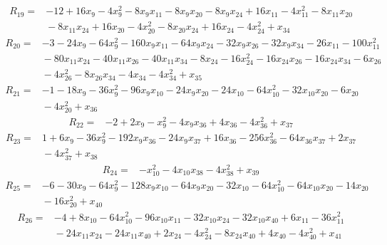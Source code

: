 \begin{align*}
R_{19}={}& -12 + 16x_{9} - 4x_{9}^{2} - 8x_{9}x_{11} - 8x_{9}x_{20} - 8x_{9}x_{24} + 16x_{11} - 4x_{11}^{2} - 8x_{11}x_{20} \\
&{} - 8x_{11}x_{24} + 16x_{20} - 4x_{20}^{2} - 8x_{20}x_{24} + 16x_{24} - 4x_{24}^{2} + x_{34}
\end{align*}
\begin{align*}
R_{20}={}& -3 - 24x_{9} - 64x_{9}^{2} - 160x_{9}x_{11} - 64x_{9}x_{24} - 32x_{9}x_{26} - 32x_{9}x_{34} - 26x_{11} - 100x_{11}^{2} \\
&{} - 80x_{11}x_{24} - 40x_{11}x_{26} - 40x_{11}x_{34} - 8x_{24} - 16x_{24}^{2} - 16x_{24}x_{26} - 16x_{24}x_{34} - 6x_{26} \\
&{} - 4x_{26}^{2} - 8x_{26}x_{34} - 4x_{34} - 4x_{34}^{2} + x_{35}
\end{align*}
\begin{align*}
R_{21}={}& -1 - 18x_{9} - 36x_{9}^{2} - 96x_{9}x_{10} - 24x_{9}x_{20} - 24x_{10} - 64x_{10}^{2} - 32x_{10}x_{20} - 6x_{20} \\
&{} - 4x_{20}^{2} + x_{36}
\end{align*}
\begin{align*}
R_{22}={}& -2 + 2x_{9} - x_{9}^{2} - 4x_{9}x_{36} + 4x_{36} - 4x_{36}^{2} + x_{37}
\end{align*}
\begin{align*}
R_{23}={}& 1 + 6x_{9} - 36x_{9}^{2} - 192x_{9}x_{36} - 24x_{9}x_{37} + 16x_{36} - 256x_{36}^{2} - 64x_{36}x_{37} + 2x_{37} \\
&{} - 4x_{37}^{2} + x_{38}
\end{align*}
\begin{align*}
R_{24}={}& -x_{10}^{2} - 4x_{10}x_{38} - 4x_{38}^{2} + x_{39}
\end{align*}
\begin{align*}
R_{25}={}& -6 - 30x_{9} - 64x_{9}^{2} - 128x_{9}x_{10} - 64x_{9}x_{20} - 32x_{10} - 64x_{10}^{2} - 64x_{10}x_{20} - 14x_{20} \\
&{} - 16x_{20}^{2} + x_{40}
\end{align*}
\begin{align*}
R_{26}={}& -4 + 8x_{10} - 64x_{10}^{2} - 96x_{10}x_{11} - 32x_{10}x_{24} - 32x_{10}x_{40} + 6x_{11} - 36x_{11}^{2} \\
&{} - 24x_{11}x_{24} - 24x_{11}x_{40} + 2x_{24} - 4x_{24}^{2} - 8x_{24}x_{40} + 4x_{40} - 4x_{40}^{2} + x_{41}
\end{align*}
